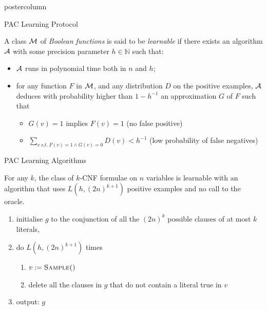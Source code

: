 \documentclass[final,hyperref={pdfpagelabels=false},xcolor=dvipsnames]{beamer}
\begin{document}
\begin{frame}
\begin{columns}
\begin{column}{.49\textwidth}
\begin{beamercolorbox}[center,wd=\textwidth]{postercolumn}
\begin{minipage}[T]{.95\textwidth}
{\begin{block}{PAC Learning Protocol}
\begin{definition}\label{def:learnclass}
   A class $\cal M$ of \emph{Boolean functions} is said to be \emph{learnable}
   if there exists an algorithm $\cal A$ with some precision parameter $h\in\mathbb N$ such that:
   \begin{itemize}
      \item $\cal A$ runs in polynomial time both in $n$ and $h$;
      \item
         for any function $F$ in $\cal M$, and any distribution $D$ on the positive examples,
         $\cal A$ deduces with probability higher than $1-h^{-1}$ an approximation $G$ of $F$ such that
         \begin{itemize}
            \item $G(v)=1$ implies $F(v)=1$ (no false positive)
            \item
               $\displaystyle\sum_{v\ s.t.\ F(v)=1\wedge G(v)=0} D(v) < h^{-1}$ (low probability of false negatives)
         \end{itemize}
   \end{itemize}
\end{definition}
            \end{block}
            \vfill
            \begin{block}{PAC Learning Algorithms}
\begin{theorem}\label{thm:kcnf}
For any $k$, the class of $k$-CNF formulae on $n$ variables is learnable with an
algorithm that uses $L(h,{(2 n)}^{k+1})$ positive examples and no call to the
oracle.
\end{theorem}

\begin{algorithm}
\begin{enumerate}
  \item initialise $g$ to the conjunction of all the $(2n)^k$ possible clauses of at most $k$ literals,
\item do $L(h,(2n)^{k+1})$ times 
\begin{enumerate}
\item $v:=\textsc{Sample}()$
\item delete all the clauses in $g$ that do not contain a literal true in $v$
\end{enumerate}
\item output: $g$
\end{enumerate}
\caption{PAC-learning of $k$-CNF formulae.\label{algCNF}}
\end{algorithm}



\end{block}}
\end{minipage}
\end{beamercolorbox}
\end{column}
\end{columns}
\end{frame}
\end{document}
